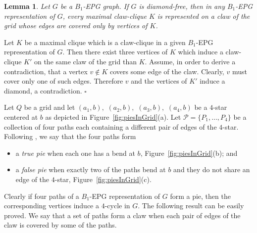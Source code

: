 \documentclass[9pt]{entcs}
\newtheorem{lema}[thm]{Lemma}%
\newtheorem{defi}[thm]{Definition}%
\begin{document}
\begin{lema}\label{lem:b1epgDiamondFree}
Let $G$ be a $B_1$-EPG graph. If $G$ is diamond-free, then in any $B_1$-EPG representation of $G$,  every maximal claw-clique $K$ is represented on a claw of the grid whose edges are covered only by vertices of $K$.
\end{lema}

\begin{pf}Let $K$ be a maximal clique which is a claw-clique in a given $B_1$-EPG representation of $G$. Then there exist three vertices of $K$ which induce a claw-clique $K'$ on
the same claw of the grid than $K$. Assume, in order to derive a contradiction, that a vertex $v\notin K$ covers some edge of the claw. Clearly, $v$ must  cover
only one of such edges. Therefore $v$ and the vertices of $K'$ induce a diamond, a contradiction. $\square$
\end{pf}



Let $ Q $ be a grid and let $ (a_1, b),$ $(a_2, b),$ $(a_3, b),$ $(a_4, b)$ be a $4$-star centered at $b$ as depicted in Figure~\ref{fig:piesInGrid}(a). Let $ \mathcal{P} = \{P_1, \dots , P_4\}$ be a collection of four paths each containing a different pair of edges of the $4$-star.
Following \cite{golumbic2009}, we say that the four paths form
\begin{itemize}
\item a \emph{true pie} %
when each one has a bend at $b$, Figure~\ref{fig:piesInGrid}(b); and 
\item a \emph {false pie} when exactly two of the paths %
bend at $b$ and they do not share an edge of the $4$-star, Figure~\ref{fig:piesInGrid}(c). %



\end{itemize}

Clearly if four paths of a $B_1$-EPG representation of $G$ form a pie, then the corresponding vertices induce a $4$-cycle in $G$. %
The following result can be easily proved. We say that a set of paths form a claw when each pair of edges of the claw is covered by some of the paths.
\end{document}
